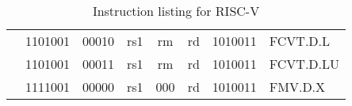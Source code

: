 \begin{table}[p]
\begin{small}
\begin{center}
\begin{tabular}{p{0in}p{0.4in}p{0.05in}p{0.05in}p{0.05in}p{0.05in}p{0.4in}p{0.6in}p{0.4in}p{0.6in}p{0.7in}l}
&
\multicolumn{4}{|c|}{1101001} &
\multicolumn{2}{c|}{00010} &
\multicolumn{1}{c|}{rs1} &
\multicolumn{1}{c|}{rm} &
\multicolumn{1}{c|}{rd} &
\multicolumn{1}{c|}{1010011} & FCVT.D.L \\
\cline{2-11}
  

&
\multicolumn{4}{|c|}{1101001} &
\multicolumn{2}{c|}{00011} &
\multicolumn{1}{c|}{rs1} &
\multicolumn{1}{c|}{rm} &
\multicolumn{1}{c|}{rd} &
\multicolumn{1}{c|}{1010011} & FCVT.D.LU \\
\cline{2-11}
  

&
\multicolumn{4}{|c|}{1111001} &
\multicolumn{2}{c|}{00000} &
\multicolumn{1}{c|}{rs1} &
\multicolumn{1}{c|}{000} &
\multicolumn{1}{c|}{rd} &
\multicolumn{1}{c|}{1010011} & FMV.D.X \\
\cline{2-11}
  

\end{tabular}
\end{center}
\end{small}
\caption{Instruction listing for RISC-V}
\end{table}
  
